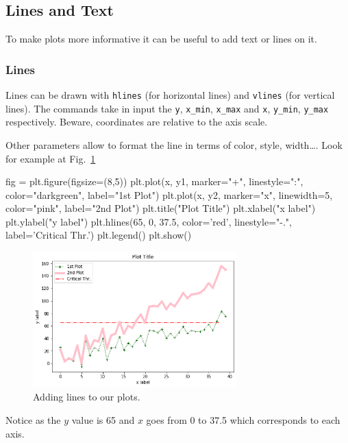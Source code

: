 \subsection{Lines and Text}\label{lines-and-text}

To make plots more informative it can be useful to add text or lines on it.

\subsubsection{Lines}\label{lines}

Lines can be drawn with \texttt{hlines} (for horizontal lines) and
\texttt{vlines} (for vertical lines). The commands take in input the \texttt{y}, \texttt{x\_min}, \texttt{x\_max} and \texttt{x}, \texttt{y\_min}, \texttt{y\_max} respectively. Beware, coordinates are relative to the axis scale.

Other parameters allow to format the line in terms of color, style, width\ldots. Look for example at Fig.~\ref{fig:lines}

\begin{ipythonnon}
fig = plt.figure(figsize=(8,5))
plt.plot(x, y1, marker="+", linestyle=":", color="darkgreen", label="1st Plot")
plt.plot(x, y2, marker="x", linewidth=5, color="pink", label="2nd Plot")
plt.title("Plot Title")
plt.xlabel("x label")
plt.ylabel("y label")
plt.hlines(65, 0, 37.5, color='red', linestyle="-.", label='Critical Thr.')
plt.legend()
plt.show()
\end{ipythonnon}

\begin{figure}[htb]
	\centering
	\includegraphics[width=0.7\textwidth]{figures/lines}
	\caption{Adding lines to our plots.}
	\label{fig:lines}
\end{figure}

Notice as the $y$ value is 65 and $x$ goes from 0 to 37.5 which corresponds to each axis.

